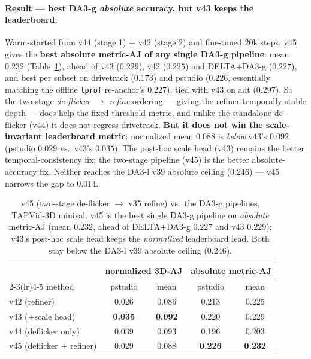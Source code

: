 \documentclass[11pt,a4paper]{article}
\begin{document}
\paragraph{Result --- best DA3-g \emph{absolute} accuracy, but v43 keeps the leaderboard.}
Warm-started from v44 (stage 1) $+$ v42 (stage 2) and fine-tuned $20$k steps, v45 gives the \textbf{best
absolute metric-AJ of any single DA3-g pipeline}: mean $0.232$ (Table~\ref{tab:v45}), ahead of v43
($0.229$), v42 ($0.225$) and DELTA$+$DA3-g ($0.227$), and best per subset on drivetrack ($0.173$) and
pstudio ($0.226$, essentially matching the offline \texttt{lprof} re-anchor's $0.227$), tied with v43 on adt
($0.297$). So the two-stage \emph{de-flicker $\to$ refine} ordering --- giving the refiner temporally stable
depth --- does help the fixed-threshold metric, and unlike the standalone de-flicker (v44) it does not
regress drivetrack. \textbf{But it does not win the scale-invariant leaderboard metric}: normalized mean
$0.088$ is \emph{below} v43's $0.092$ (pstudio $0.029$ vs.\ v43's $0.035$). The post-hoc scale head (v43)
remains the better temporal-consistency fix; the two-stage pipeline (v45) is the better absolute-accuracy
fix. Neither reaches the DA3-l v39 absolute ceiling ($0.246$) --- v45 narrows the gap to $0.014$.

\begin{table}[h]
\centering
\caption{v45 (two-stage de-flicker $\to$ v35 refine) vs.\ the DA3-g pipelines, TAPVid-3D minival. v45 is the
best single DA3-g pipeline on \emph{absolute} metric-AJ (mean $0.232$, ahead of DELTA$+$DA3-g $0.227$ and
v43 $0.229$); v43's post-hoc scale head keeps the \emph{normalized} leaderboard lead. Both stay below the
DA3-l v39 absolute ceiling ($0.246$).}
\label{tab:v45}
\begin{tabular}{lcccc}
\toprule
 & \multicolumn{2}{c}{normalized 3D-AJ} & \multicolumn{2}{c}{absolute metric-AJ} \\
\cmidrule(lr){2-3}\cmidrule(lr){4-5}
method & pstudio & mean & pstudio & mean \\
\midrule
v42 (refiner)               & 0.026 & 0.086 & 0.213 & 0.225 \\
v43 ($+$scale head)         & \textbf{0.035} & \textbf{0.092} & 0.220 & 0.229 \\
v44 (deflicker only)        & 0.039 & 0.093 & 0.196 & 0.203 \\
v45 (deflicker $+$ refiner) & 0.029 & 0.088 & \textbf{0.226} & \textbf{0.232} \\
\bottomrule
\end{tabular}
\end{table}
\end{document}

